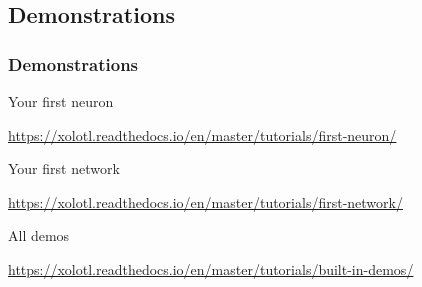 \documentclass{beamer}
\begin{document}

\subsection{Demonstrations}

\begin{frame}
  \frametitle{Demonstrations}

  Your first neuron

  \medskip

  \url{https://xolotl.readthedocs.io/en/master/tutorials/first-neuron/}

  \medskip
  Your first network
  \medskip

  \url{https://xolotl.readthedocs.io/en/master/tutorials/first-network/}

  \medskip
  All demos
  \medskip

  \url{https://xolotl.readthedocs.io/en/master/tutorials/built-in-demos/}\medskip

\end{frame}
\end{document}
